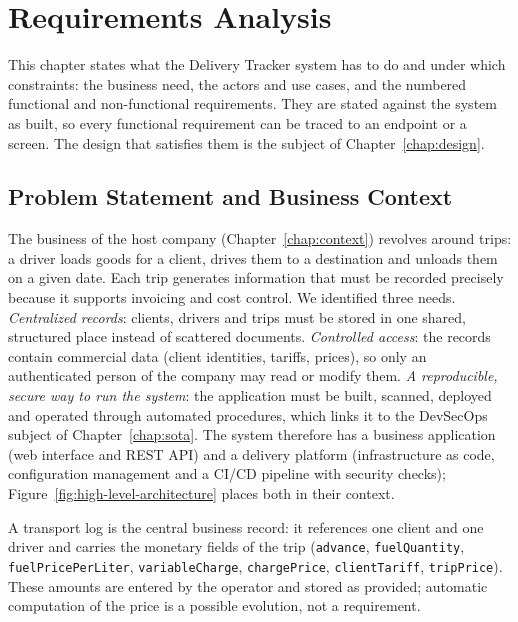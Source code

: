 
\chapter{Requirements Analysis}\label{chap:requirements}

This chapter states what the Delivery Tracker system has to do and under which constraints: the business need, the actors and use cases, and the numbered functional and non-functional requirements. They are stated against the system as built, so every functional requirement can be traced to an endpoint or a screen. The design that satisfies them is the subject of Chapter~\ref{chap:design}.

\section{Problem Statement and Business Context}

The business of the host company (Chapter~\ref{chap:context}) revolves around trips: a driver loads goods for a client, drives them to a destination and unloads them on a given date. Each trip generates information that must be recorded precisely because it supports invoicing and cost control. We identified three needs. \emph{Centralized records}: clients, drivers and trips must be stored in one shared, structured place instead of scattered documents. \emph{Controlled access}: the records contain commercial data (client identities, tariffs, prices), so only an authenticated person of the company may read or modify them. \emph{A reproducible, secure way to run the system}: the application must be built, scanned, deployed and operated through automated procedures, which links it to the DevSecOps subject of Chapter~\ref{chap:sota}. The system therefore has a business application (web interface and REST API) and a delivery platform (infrastructure as code, configuration management and a CI/CD pipeline with security checks); Figure~\ref{fig:high-level-architecture} places both in their context.



A transport log is the central business record: it references one client and one driver and carries the monetary fields of the trip (\texttt{advance}, \texttt{fuelQuantity}, \texttt{fuelPricePerLiter}, \texttt{variableCharge}, \texttt{chargePrice}, \texttt{clientTariff}, \texttt{tripPrice}). These amounts are entered by the operator and stored as provided; automatic computation of the price is a possible evolution, not a requirement.

